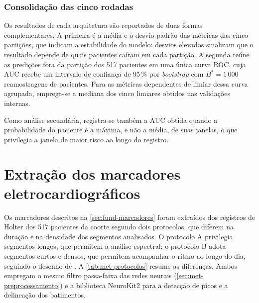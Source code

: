 \subsubsection{Consolidação das cinco rodadas}

Os resultados de cada arquitetura são reportados de duas formas
complementares. A primeira é a média e o desvio-padrão das métricas das
cinco partições, que indicam a estabilidade do modelo: desvios elevados
sinalizam que o resultado depende de quais pacientes caíram em cada
partição. A segunda reúne as predições fora da partição dos 517 pacientes em
uma única curva ROC, cuja \gls{AUC} recebe um intervalo de confiança de
95\,\% por \textit{bootstrap} com $B^{*} = 1\,000$ reamostragens de
pacientes. Para as métricas dependentes de limiar dessa curva agrupada,
emprega-se a mediana dos cinco limiares obtidos nas validações internas.

Como análise secundária, registra-se também a \gls{AUC} obtida quando a
probabilidade do paciente é a máxima, e não a média, de suas janelas, o que
privilegia a janela de maior risco ao longo do registro.



%
%

\section{Extração dos marcadores eletrocardiográficos}
\label{sec:met-extracao}

Os marcadores descritos na \autoref{sec:fund-marcadores} foram extraídos dos
registros de Holter dos 517 pacientes da coorte segundo dois protocolos,
que diferem na duração e na densidade dos segmentos analisados. O protocolo
A privilegia segmentos longos, que permitem a análise espectral; o protocolo
B adota segmentos curtos e densos, que permitem acompanhar o ritmo ao longo
do dia, seguindo o desenho de . A
\autoref{tab:met-protocolos} resume as diferenças. Ambos empregam o mesmo
filtro passa-faixa das redes neurais (\autoref{sec:met-preprocessamento}) e
a biblioteca NeuroKit2 \cite{makowski2021neurokit2} para a detecção de picos
e a delineação dos batimentos.

